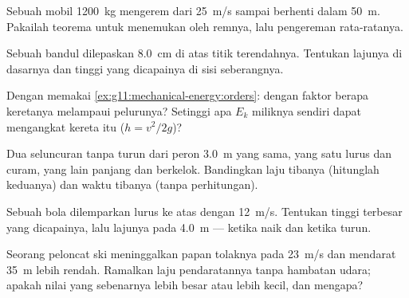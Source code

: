\begin{exercise}[$\star$]\label{exo:g11:mechanical-energy:4}
Sebuah mobil \qty{1200}{kg} mengerem dari \qty{25}{m/s} sampai berhenti
dalam \qty{50}{m}. Pakailah teorema  untuk menemukan 
oleh remnya, lalu  pengereman rata-ratanya.
\end{exercise}

\begin{exercise}[$\star$]\label{exo:g11:mechanical-energy:5}
Sebuah bandul dilepaskan \qty{8.0}{cm} di atas titik terendahnya.
Tentukan lajunya di dasarnya dan tinggi yang dicapainya di sisi
seberangnya.
\end{exercise}

\begin{exercise}[$\star\star$]\label{exo:g11:mechanical-energy:6}
Dengan memakai \cref{ex:g11:mechanical-energy:orders}: dengan faktor
berapa  keretanya melampaui  pelurunya?
Setinggi apa $E_k$ miliknya sendiri dapat mengangkat kereta itu
($h = v^2/2g$)?
\end{exercise}

\begin{exercise}[$\star\star$]\label{exo:g11:mechanical-energy:7}
Dua seluncuran tanpa  turun dari peron \qty{3.0}{m} yang sama,
yang satu lurus dan curam, yang lain panjang dan berkelok. Bandingkan
laju tibanya (hitunglah keduanya) dan waktu tibanya (tanpa
perhitungan).
\end{exercise}

\begin{exercise}[$\star\star$]\label{exo:g11:mechanical-energy:8}
Sebuah bola dilemparkan lurus ke atas dengan \qty{12}{m/s}. Tentukan
tinggi terbesar yang dicapainya, lalu lajunya pada \qty{4.0}{m} ---
ketika naik dan ketika turun.
\end{exercise}

\begin{exercise}[$\star\star$]\label{exo:g11:mechanical-energy:9}
Seorang peloncat ski meninggalkan papan tolaknya pada \qty{23}{m/s} dan
mendarat \qty{35}{m} lebih rendah. Ramalkan laju pendaratannya tanpa
hambatan udara; apakah nilai yang sebenarnya lebih besar atau lebih
kecil, dan mengapa?
\end{exercise}

